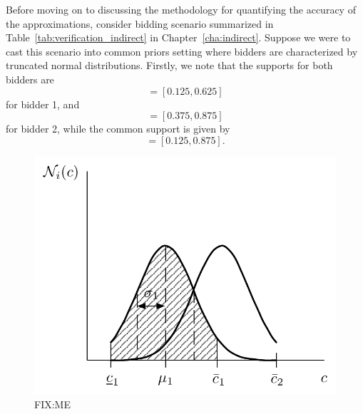 Before moving on to discussing the methodology for quantifying the accuracy of the approximations, consider bidding scenario summarized in Table~\ref{tab:verification_indirect} in Chapter~\ref{cha:indirect}. Suppose we were to cast this scenario into common priors setting where bidders are characterized by truncated normal distributions. Firstly, we note that the supports for both bidders are
\begin{equation*}
  [\underline{c}_1, \bar{c}_1] = [0.125, 0.625]
\end{equation*}
for bidder 1, and
\begin{equation*}
  [\underline{c}_2, \bar{c}_2] = [0.375, 0.875]
\end{equation*}
for bidder 2, while the common support is given by
\begin{equation*}
  [\underline{c}_1, \bar{c}_2] = [0.125, 0.875].
\end{equation*}

\begin{figure}[t]
  \includegraphics[width=\figsize]{Approximation/Figures/modelling_params}
  \caption{FIX:ME}
  \label{fig:modelling_params_approximation}
\end{figure}

